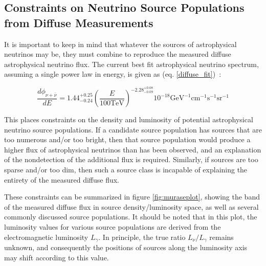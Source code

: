 \subsection{Constraints on Neutrino Source Populations from Diffuse Measurements}
It is important to keep in mind that whatever the sources of astrophysical neutrinos may be, they must combine to reproduce the measured diffuse astrophysical neutrino flux. The current best fit astrophysical neutrino spectrum, assuming a single power law in energy, is given as (eq. \ref{diffuse_fit})~\cite{stettner2019measurement}:

\begin{equation}
    \frac{d\phi_{\nu+\bar{\nu}}}{dE} = 1.44_{-0.24}^{+0.25} (\frac{E}{100 \textrm{TeV}})^{-2.28_{-0.09}^{+0.08}} 10^{-18} \textrm{GeV}^{-1}\textrm{cm}^{-1}\textrm{s}^{-1}\textrm{sr}^{-1}
\label{diffuse_fit}
\end{equation}

This places constraints on the density and luminosity of potential astrophysical neutrino source populations. If a candidate source population has sources that are too numerous and/or too bright, then that source population would produce a higher flux of astrophysical neutrinos than has been observed, and an explanation of the nondetection of the additional flux is required. Similarly, if sources are too sparse and/or too dim, then such a source class is incapable of explaining the entirety of the measured diffuse flux. 

These constraints can be summarized in figure \ref{fig:muraseplot}, showing the band of the measured diffuse flux in source density/luminosity space, as well as several commonly discussed source populations. It should be noted that in this plot, the luminosity values for various source populations are derived from the electromagnetic luminosity $L_\gamma$. In principle, the true ratio $L_\nu/L_\gamma$ remains unknown, and consequently the positions of sources along the luminosity axis may shift according to this value. 


